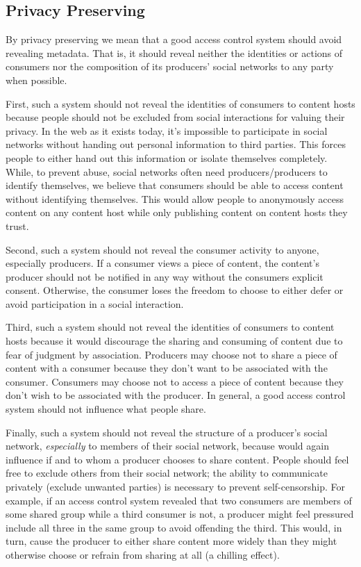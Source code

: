 \documentclass[pdftex,12pt,a4papaer,twoside,notitlepage]{report}
\begin{document}
\subsection{Privacy Preserving}

By privacy preserving we mean that a good access control system should avoid
revealing metadata. That is, it should reveal neither the identities or actions
of consumers nor the composition of its producers' social networks to any party
when possible.

First, such a system should not reveal the identities of consumers to content
hosts because people should not be excluded from social interactions for valuing
their privacy. In the web as it exists today, it's impossible to participate in
social networks without handing out personal information to third parties. This
forces people to either hand out this information or isolate themselves
completely. While, to prevent abuse, social networks often need
producers/producers to identify themselves, we believe that consumers should
be able to access content without identifying themselves. This would allow
people to anonymously access content on any content host while only publishing
content on content hosts they trust.

Second, such a system should not reveal the consumer activity to anyone,
especially producers. If a consumer views a piece of content, the content's
producer should not be notified in any way without the consumers explicit
consent. Otherwise, the consumer loses the freedom to choose to either defer or
avoid participation in a social interaction.

Third, such a system should not reveal the identities of consumers to content
hosts because it would discourage the sharing and consuming of content due to
fear of judgment by association. Producers may choose not to share a piece of
content with a consumer because they don't want to be associated with the
consumer. Consumers may choose not to access a piece of content because they
don't wish to be associated with the producer. In general, a good access
control system should not influence what people share.

Finally, such a system should not reveal the structure of a producer's social
network, \emph{especially} to members of their social network, because would
again influence if and to whom a producer chooses to share content. People
should feel free to exclude others from their social network; the ability to
communicate privately (exclude unwanted parties) is necessary to prevent
self-censorship. For example, if an access control system revealed that two
consumers are members of some shared group while a third consumer is not, a
producer might feel pressured include all three in the same group to avoid
offending the third. This would, in turn, cause the producer to either share
content more widely than they might otherwise choose or refrain from sharing at
all (a chilling effect).
\end{document}

